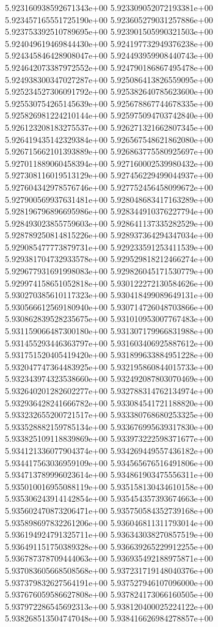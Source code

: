 5.923160938592671343e+00
5.923309052072193381e+00
5.923457165551725190e+00
5.923605279031257886e+00
5.923753392510789695e+00
5.923901505990321503e+00
5.924049619469844430e+00
5.924197732949376238e+00
5.924345846428908047e+00
5.924493959908440743e+00
5.924642073387972552e+00
5.924790186867495478e+00
5.924938300347027287e+00
5.925086413826559095e+00
5.925234527306091792e+00
5.925382640785623600e+00
5.925530754265145639e+00
5.925678867744678335e+00
5.925826981224210144e+00
5.925975094703742840e+00
5.926123208183275537e+00
5.926271321662807345e+00
5.926419435142329384e+00
5.926567548621862080e+00
5.926715662101393889e+00
5.926863775580925697e+00
5.927011889060458394e+00
5.927160002539980432e+00
5.927308116019513129e+00
5.927456229499044937e+00
5.927604342978576746e+00
5.927752456458099672e+00
5.927900569937631481e+00
5.928048683417163289e+00
5.928196796896695986e+00
5.928344910376227794e+00
5.928493023855759603e+00
5.928641137335282529e+00
5.928789250814815226e+00
5.928937364294347034e+00
5.929085477773879731e+00
5.929233591253411539e+00
5.929381704732933578e+00
5.929529818212466274e+00
5.929677931691998083e+00
5.929826045171530779e+00
5.929974158651052818e+00
5.930122272130584626e+00
5.930270385610117323e+00
5.930418499089649131e+00
5.930566612569180940e+00
5.930714726048703866e+00
5.930862839528235675e+00
5.931010953007767483e+00
5.931159066487300180e+00
5.931307179966831988e+00
5.931455293446363797e+00
5.931603406925887612e+00
5.931751520405419420e+00
5.931899633884951228e+00
5.932047747364483925e+00
5.932195860844015733e+00
5.932343974323538660e+00
5.932492087803070469e+00
5.932640201282602277e+00
5.932788314762134974e+00
5.932936428241666782e+00
5.933084541721188820e+00
5.933232655200721517e+00
5.933380768680253325e+00
5.933528882159785134e+00
5.933676995639317830e+00
5.933825109118839869e+00
5.933973222598371677e+00
5.934121336077904374e+00
5.934269449557436182e+00
5.934417563036959109e+00
5.934565676516491806e+00
5.934713789996023614e+00
5.934861903475556311e+00
5.935010016955088119e+00
5.935158130434610158e+00
5.935306243914142854e+00
5.935454357393674663e+00
5.935602470873206471e+00
5.935750584352739168e+00
5.935898697832261206e+00
5.936046811311793014e+00
5.936194924791325711e+00
5.936343038270857519e+00
5.936491151750389328e+00
5.936639265229912255e+00
5.936787378709444063e+00
5.936935492188975871e+00
5.937083605668508568e+00
5.937231719148040376e+00
5.937379832627564191e+00
5.937527946107096000e+00
5.937676059586627808e+00
5.937824173066160505e+00
5.937972286545692313e+00
5.938120400025224122e+00
5.938268513504747048e+00
5.938416626984278857e+00
